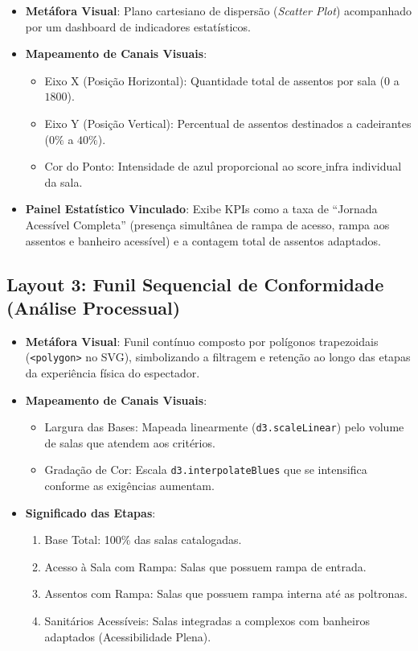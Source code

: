 \documentclass[12pt]{article}
\begin{document}
\begin{itemize}
    \item \textbf{Metáfora Visual}: Plano cartesiano de dispersão (\textit{Scatter Plot}) acompanhado por um dashboard de indicadores estatísticos.
    \item \textbf{Mapeamento de Canais Visuais}:
    \begin{itemize}
      \item Eixo X (Posição Horizontal): Quantidade total de assentos por sala ($0$ a $1800$).  
      \item Eixo Y (Posição Vertical): Percentual de assentos destinados a cadeirantes ($0\%$ a $40\%$). 
      \item Cor do Ponto: Intensidade de azul proporcional ao $\text{score\_infra}$ individual da sala. 
    \end{itemize}
    \item \textbf{Painel Estatístico Vinculado}: Exibe KPIs como a taxa de ``Jornada Acessível Completa'' 
    (presença simultânea de rampa de acesso, rampa aos assentos e banheiro acessível) e a contagem total de assentos adaptados.
\end{itemize}

\subsection{Layout 3: Funil Sequencial de Conformidade (Análise Processual)}

\begin{itemize}
    \item \textbf{Metáfora Visual}: Funil contínuo composto por polígonos trapezoidais (\texttt{<polygon>} no SVG), 
    simbolizando a filtragem e retenção ao longo das etapas da experiência física do espectador.
    \item \textbf{Mapeamento de Canais Visuais}:
    \begin{itemize}
    \item Largura das Bases: Mapeada linearmente (\texttt{d3.scaleLinear}) pelo volume de salas que atendem aos critérios.
    \item Gradação de Cor: Escala \texttt{d3.interpolateBlues} que se intensifica conforme as exigências aumentam.
    \end{itemize}
    \item \textbf{Significado das Etapas}:
    \begin{enumerate}
    \item Base Total: 100\% das salas catalogadas.
    \item Acesso à Sala com Rampa: Salas que possuem rampa de entrada.
    \item Assentos com Rampa: Salas que possuem rampa interna até as poltronas.
    \item Sanitários Acessíveis: Salas integradas a complexos com banheiros adaptados (Acessibilidade Plena).
    \end{enumerate}
\end{itemize}
\end{document}
